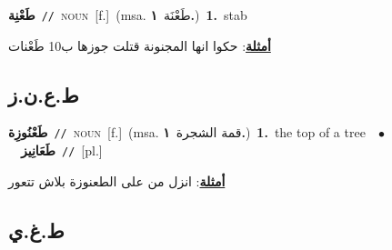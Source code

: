 \documentclass[10pt,a4paper,twoside]{article} %
\begin{document}
\begin{multicols}{2}
{\setlength\topsep{0pt}\textbf{\foreignlanguage{arabic}{طَعْنِة}}\ {\color{gray}\texttt{//}\color{black}}\ \textsc{noun}\ [f.]\ \color{gray}(msa. \foreignlanguage{arabic}{طَعْنَة}~\foreignlanguage{arabic}{\textbf{١.}})\color{black}\ \textbf{1.}~stab\  \begin{flushright}\color{gray}\foreignlanguage{arabic}{\textbf{\underline{\foreignlanguage{arabic}{أمثلة}}}: حكوا انها المجنونة قتلت جوزها ب10 طَعْنات}\end{flushright}\color{black}} \vspace{2mm}

\vspace{-3mm}
\subsection*{\color{blue}\foreignlanguage{arabic}{ط.ع.ن.ز}\color{blue}{ (ntws)}} 

{\setlength\topsep{0pt}\textbf{\foreignlanguage{arabic}{طَعْنُوزِة}}\ {\color{gray}\texttt{//}\color{black}}\ \textsc{noun}\ [f.]\ \color{gray}(msa. \foreignlanguage{arabic}{قمة الشجرة}~\foreignlanguage{arabic}{\textbf{١.}})\color{black}\ \textbf{1.}~the top of a tree\ \ $\bullet$\ \ \setlength\topsep{0pt}\textbf{\foreignlanguage{arabic}{طَعَانِيز}}\ {\color{gray}\texttt{//}\color{black}}\ [pl.]\  \begin{flushright}\color{gray}\foreignlanguage{arabic}{\textbf{\underline{\foreignlanguage{arabic}{أمثلة}}}: انزل من على الطعنوزة بلاش تتعور}\end{flushright}\color{black}} \vspace{2mm}

\vspace{-3mm}
\subsection*{\color{blue}\foreignlanguage{arabic}{ط.غ.ي}\color{blue}{}} 


\end{multicols}
\end{document}
